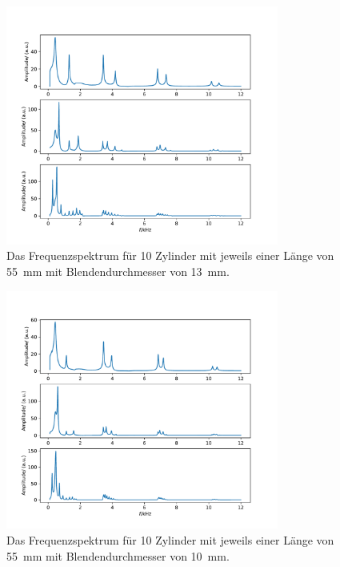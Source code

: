 \begin{figure}
    \centering
    \includegraphics[width=0.8\textwidth]{plots/B_3.pdf}
    \caption{Das Frequenzspektrum für 10 Zylinder mit jeweils einer Länge von \SI{55}{\milli\metre} mit Blendendurchmesser von \SI{13}{\milli\metre}.}
    \label{fig:spec10_13}
\end{figure}

\begin{figure}
    \centering
    \includegraphics[width=0.8\textwidth]{plots/B_2.pdf}
    \caption{Das Frequenzspektrum für 10 Zylinder mit jeweils einer Länge von \SI{55}{\milli\metre} mit Blendendurchmesser von \SI{10}{\milli\metre}.}
    \label{fig:spec10_10}
\end{figure}

